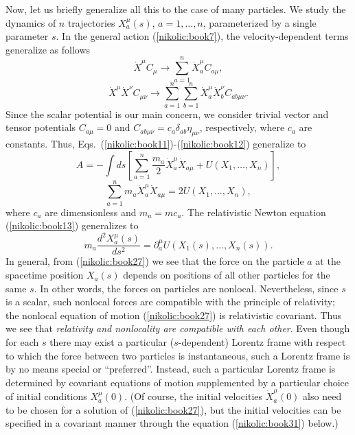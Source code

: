 \documentclass[12pt,twoside]{report} %
\begin{document}
Now, let us briefly generalize all this to the case of many particles.
We study the dynamics of $n$ trajectories $X_a^{\mu}(s)$, $a=1,\ldots,n$, 
parameterized by a single parameter $s$.
In the general action (\ref{nikolic:book7}), the velocity-dependent terms
generalize as follows
\begin{equation}
\dot{X}^{\mu}C_{\mu} \rightarrow \sum_{a=1}^n \dot{X}_a^{\mu} C_{a\mu} ,
\end{equation}
\begin{equation}
\dot{X}^{\mu}\dot{X}^{\nu}C_{\mu\nu} \rightarrow 
\sum_{a=1}^n  \sum_{b=1}^n \dot{X}_a^{\mu} \dot{X}_b^{\nu}C_{ab\mu\nu} .
\end{equation}
Since the scalar potential is our main concern, we consider trivial vector and tensor potentials
$C_{a\mu}=0$ and $C_{ab\mu\nu}=c_a\delta_{ab}\eta_{\mu\nu}$, respectively, where
$c_a$ are constants.
Thus, Eqs.~(\ref{nikolic:book11})-(\ref{nikolic:book12}) generalize to
\begin{equation}\label{nikolic:book25}
 A=-\int ds \left[  \sum_{a=1}^n \frac{m_a}{2}
\dot{X}_a^{\mu} \dot{X}_{a\mu} + 
U(X_1,\ldots,X_n) \right]  ,
\end{equation}
\begin{equation}\label{nikolic:book26}
 \sum_{a=1}^n m_a \dot{X}_a^{\mu}\dot{X}_{a\mu}=2U(X_1,\ldots,X_n) ,
\end{equation}
where $c_a$ are dimensionless and $m_a=mc_a$.
The relativistic Newton equation (\ref{nikolic:book13}) generalizes to
\begin{equation}\label{nikolic:book27}
 m_a\frac{d^2X_a^{\mu}(s)}{ds^2}=\partial_a^{\mu}U(X_1(s),\ldots,X_n(s)) .
\end{equation}
In general, from (\ref{nikolic:book27}) we see that the force on the particle $a$
at the spacetime position $X_a(s)$ depends on positions of all other particles
for the same $s$. In other words, the forces on particles are nonlocal. Nevertheless,
since $s$ is a scalar, such nonlocal forces are compatible with the principle of relativity;
the nonlocal equation of motion (\ref{nikolic:book27}) is relativistic covariant.
Thus we see that {\em relativity and nonlocality are compatible with each other}.
Even though for each $s$ there may exist a particular ($s$-dependent) 
Lorentz frame with respect to which
the force between two particles is instantaneous, such a Lorentz frame is by no means
special or ``preferred''. Instead, such a particular Lorentz frame is determined by covariant
equations of motion supplemented by a particular choice of initial
conditions $X_a^{\mu}(0)$.
(Of course, the initial velocities $\dot{X}_a^{\mu}(0)$ also need to be 
chosen for a solution of (\ref{nikolic:book27}), but the initial
velocities can be specified in a covariant manner through the equation
(\ref{nikolic:book31}) below.)
\end{document}
